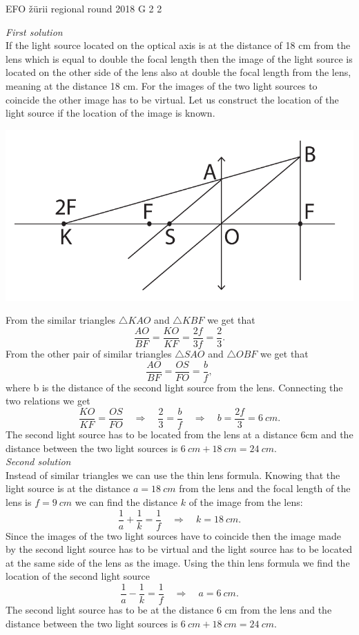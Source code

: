 \documentclass[11pt]{article}
\begin{document}
{EFO žürii} %
{regional round} %
{2018} %
{G 2} %
{2} %
{

\ifEngSolution
\emph{First solution}\\
If the light source located on the optical axis is at the distance of 18 cm from the lens which is equal to double the focal length then the image of the light source is located on the other side of the lens also at double the focal length from the lens, meaning at the distance 18 cm. For the images of the two light sources to coincide the other image has to be virtual. Let us construct the location of the light source if the location of the image is known.
\begin{center}
    \includegraphics[width=0.7\linewidth]{2018-v2g-02-valgusallikaslah}
  \end{center}
From the similar triangles $\triangle KAO$ and $\triangle KBF$ we get that
\[ \frac{AO}{BF} = \frac{KO}{KF} = \frac{2f}{3f} = \frac{2}{3}. \] 
From the other pair of similar triangles $\triangle SAO$ and $\triangle OBF$ we get that
\[  \frac{AO}{BF} = \frac{OS}{FO} = \frac{b}{f},  \] 
where b is the distance of the second light source from the lens. Connecting the two relations we get
\[ \frac{KO}{KF}=\frac{OS}{FO} \quad\Rightarrow\quad \frac{2}{3} = \frac{b}{f} \quad\Rightarrow\quad b = \frac{2f}{3} = \SI{6}{cm}. \] 
The second light source has to be located from the lens at a distance 6cm and the distance between the two light sources is $\SI{6}{cm} + \SI{18}{cm} = \SI{24}{cm}$. \\

\emph{Second solution}\\
Instead of similar triangles we can use the thin lens formula. Knowing that the light source is at the distance $a = \SI{18}{cm}$ from the lens and the focal length of the lens is $f=\SI{9}{cm}$ we can find the distance $k$ of the image from the lens:
\[ \frac{1}{a} + \frac{1}{k} = \frac{1}{f} \quad\Rightarrow\quad k = \SI{18}{cm}. \] 
Since the images of the two light sources have to coincide then the image made by the second light source has to be virtual and the light source has to be located at the same side of the lens as the image. Using the thin lens formula we find the location of the second light source 
\[ \frac{1}{a} - \frac{1}{k} = \frac{1}{f} \quad\Rightarrow\quad a = \SI{6}{cm}. \] 
The second light source has to be at the distance 6 cm from the lens and the distance between the two light sources is $\SI{6}{cm} + \SI{18}{cm} = \SI{24}{cm}$.
\fi
}
\end{document}
